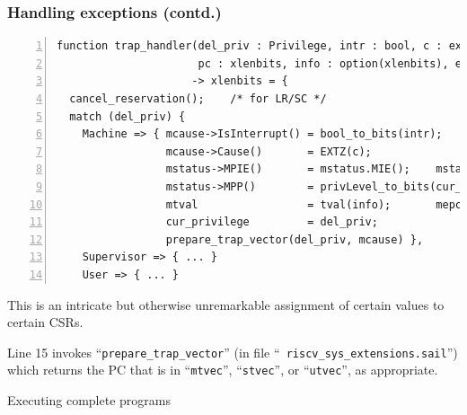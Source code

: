 \documentclass[aspectratio=169]{beamer}
\newcommand{\slidefont}{\scriptsize}
\newcommand{\cf}{\scriptsize\tt}
\begin{document}
\begin{frame}[fragile]
  \frametitle{Handling exceptions (contd.)}

  \slidefont

  \begin{Verbatim}[frame=single, numbers=left, label = File riscv\_sys\_control.sail]
function trap_handler(del_priv : Privilege, intr : bool, c : exc_code,
                      pc : xlenbits, info : option(xlenbits), ext : option(ext_exception))
                     -> xlenbits = {
  cancel_reservation();    /* for LR/SC */
  match (del_priv) {
    Machine => { mcause->IsInterrupt() = bool_to_bits(intr);
                 mcause->Cause()       = EXTZ(c);
                 mstatus->MPIE()       = mstatus.MIE();    mstatus->MIE() = 0b0;
                 mstatus->MPP()        = privLevel_to_bits(cur_privilege);
                 mtval                 = tval(info);       mepc           = pc;
                 cur_privilege         = del_priv;
                 prepare_trap_vector(del_priv, mcause) },
    Supervisor => { ... }
    User => { ... }
  \end{Verbatim}

  \begin{minipage}{\textwidth}
    This is an intricate but otherwise unremarkable assignment of certain values to certain CSRs.

    \vspace{1ex}

    Line 15 invokes ``{\cf prepare\_trap\_vector}'' (in file ``{\cf
      riscv\_sys\_extensions.sail}'') which returns the PC that is in
    ``{\cf mtvec}'', ``{\cf stvec}'', or ``{\cf utvec}'', as appropriate.

  \end{minipage}

\end{frame}


\begin{frame}[fragile]

  \slidefont

  \vfill

  \begin{center}\LARGE
    Executing complete programs
  \end{center}

  \vfill

\end{frame}

\end{document}
